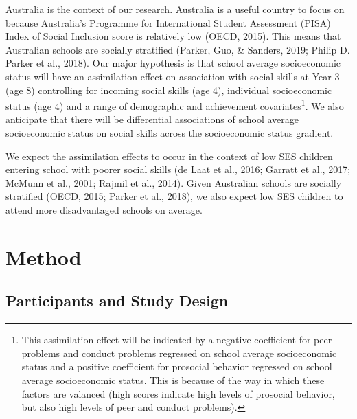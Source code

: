 \documentclass[
  english,
  man]{apa6}
\begin{document}
Australia is the context of our research. Australia is a useful country to focus on because Australia's Programme for International Student Assessment (PISA) Index of Social Inclusion score is relatively low (OECD, 2015). This means that Australian schools are socially stratified (Parker, Guo, \& Sanders, 2019; Philip D. Parker et al., 2018). Our major hypothesis is that school average socioeconomic status will have an assimilation effect on association with social skills at Year 3 (age 8) controlling for incoming social skills (age 4), individual socioeconomic status (age 4) and a range of demographic and achievement covariates\footnote{This assimilation effect will be indicated by a negative coefficient for peer problems and conduct problems regressed on school average socioeconomic status and a positive coefficient for prosocial behavior regressed on school average socioeconomic status. This is because of the way in which these factors are valanced (high scores indicate high levels of prosocial behavior, but also high levels of peer and conduct problems).}. We also anticipate that there will be differential associations of school average socioeconomic status on social skills across the socioeconomic status gradient.

We expect the assimilation effects to occur in the context of low SES children entering school with poorer social skills (de Laat et al., 2016; Garratt et al., 2017; McMunn et al., 2001; Rajmil et al., 2014). Given Australian schools are socially stratified (OECD, 2015; Parker et al., 2018), we also expect low SES children to attend more disadvantaged schools on average.

\hypertarget{method}{%
\section{Method}\label{method}}

\hypertarget{participants-and-study-design}{%
\subsection{Participants and Study Design}\label{participants-and-study-design}}
\end{document}

